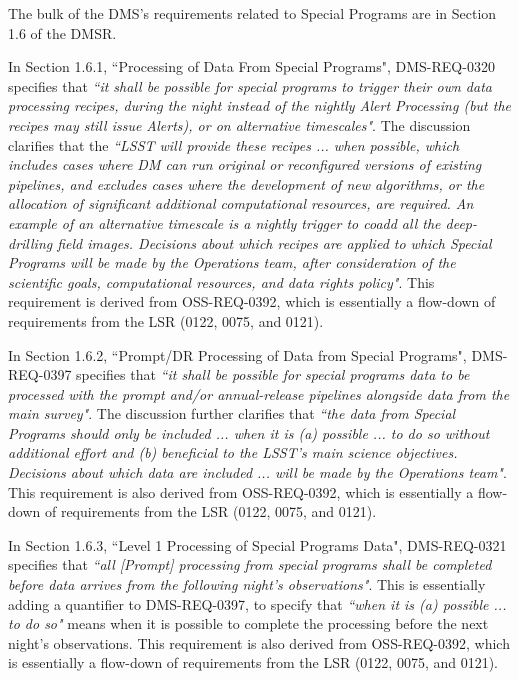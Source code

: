 The bulk of the DMS's requirements related to Special Programs are in Section 1.6 of the DMSR.

In Section 1.6.1, ``Processing of Data From Special Programs", DMS-REQ-0320 specifies that {\it ``it shall be possible for special programs to trigger their own data processing recipes, during the night instead of the nightly Alert Processing (but the recipes may still issue Alerts), or on alternative timescales"}.
The discussion clarifies that the {\it ``LSST will provide these recipes ... when
possible, which includes cases where DM can run original or reconfigured versions of existing pipelines, and excludes cases where the development of new algorithms, or the allocation of significant additional computational resources, are required. An example of an alternative timescale is a nightly trigger to coadd all the deep-drilling field images. Decisions about which recipes are applied to which Special Programs will be made by the Operations team, after consideration of the scientific goals, computational resources, and data rights policy"}.
This requirement is derived from OSS-REQ-0392, which is essentially a flow-down of requirements from the LSR (0122, 0075, and 0121).

In Section 1.6.2, ``Prompt/DR Processing of Data from Special Programs", DMS-REQ-0397 specifies that {\it ``it shall be possible for special programs data to be processed with the prompt and/or annual-release pipelines alongside data from the main survey"}.
The discussion further clarifies that {\it ``the data from Special Programs should only be included ... when it is (a) possible ... to do so without additional effort and (b) beneficial to the LSST's main science objectives. Decisions about which data are included ... will be made by the Operations team"}.
This requirement is also derived from OSS-REQ-0392, which is essentially a flow-down of requirements from the LSR (0122, 0075, and 0121).

In Section 1.6.3, ``Level 1 Processing of Special Programs Data", DMS-REQ-0321 specifies that {\it ``all [Prompt] processing from special programs shall be completed before data arrives from the following night's observations"}.
This is essentially adding a quantifier to DMS-REQ-0397, to specify that {\it ``when it is (a) possible ... to do so"} means when it is possible to complete the processing before the next night's observations.
This requirement is also derived from OSS-REQ-0392, which is essentially a flow-down of requirements from the LSR (0122, 0075, and 0121).

